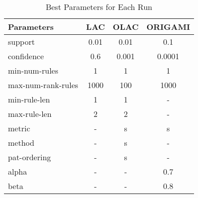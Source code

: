 \begin{table}[htbp]
	\centering
		\begin{tabular}{|l|c|c|c|}
		\hline
		\textbf{Parameters}	& \textbf{LAC}	& \textbf{OLAC}	& \textbf{ORIGAMI}	\\
		\hline
		support			& 0.01		& 0.01		& 0.1			\\
		\hline
		confidence		& 0.6		& 0.001		& 0.0001		\\
		\hline
		min-num-rules		& 1		& 1		& 1			\\
		\hline
		max-num-rank-rules	& 1000		& 100		& 1000			\\
		\hline
		min-rule-len		& 1		& 1		& -			\\
		\hline
		max-rule-len		& 2		& 2		& -			\\
		\hline
		metric			& -		& s		& s			\\
		\hline
		method			& -		& s		& -			\\
		\hline
		pat-ordering		& -		& s		& -			\\
		\hline
		alpha			& -		& -		& 0.7			\\
		\hline
		beta			& -		& -		& 0.8			\\
		\hline
		\end{tabular}
	\caption{Best Parameters for Each Run}
	\label{tab:best_parms_for_avg_db}
\end{table}